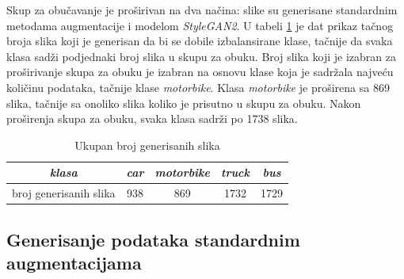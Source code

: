 \documentclass[12pt,oneside]{memoir}
\begin{document}
Skup za obučavanje je proširivan na dva načina: slike su generisane standardnim metodama augmentacije i modelom \textit{StyleGAN2}. U tabeli \ref{tab:section4_generisaneslike} je dat prikaz tačnog broja slika koji je generisan da bi se dobile izbalansirane klase, tačnije da svaka klasa sadži podjednaki broj slika u skupu za obuku. 
Broj slika koji je izabran za proširivanje skupa za obuku je izabran na osnovu klase koja je sadržala najveću količinu podataka, tačnije klase \textit{motorbike}. Klasa \textit{motorbike} je proširena sa 869 slika, tačnije sa onoliko slika koliko je prisutno u skupu za obuku. Nakon proširenja skupa za obuku, svaka klasa sadrži po 1738 slika.

\begin{table}[h!]
    \begin{center}
    \caption{Ukupan broj generisanih slika}\label{tab:section4_generisaneslike}
    \begin{tabular}{c|c|c|c|c}
        \textit{klasa} & \textit{car} &  \textit{motorbike} &  \textit{truck} & \textit{bus} \\ 
        \hline
        broj generisanih slika & 938 & 869 & 1732 & 1729 \\ 
    \end{tabular}
    \end{center}
\end{table}

\subsection{Generisanje podataka standardnim augmentacijama}
\end{document}

